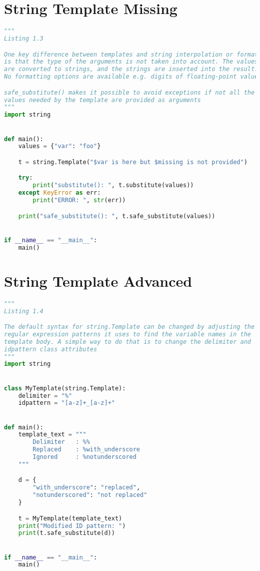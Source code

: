 \documentclass[a4paper,landscape]{report}
\begin{document}
\section{String Template Missing}
\begin{lstlisting}[language=Python]
"""
Listing 1.3

One key difference between templates and string interpolation or formatting
is that the type of the arguments is not taken into account. The values
are converted to strings, and the strings are inserted into the result.
No formatting options are available e.g. digits of floating-point value

safe_substitute() makes it possible to avoid exceptions if not all the
values needed by the template are provided as arguments
"""
import string


def main():
    values = {"var": "foo"}

    t = string.Template("$var is here but $missing is not provided")

    try:
        print("substitute(): ", t.substitute(values))
    except KeyError as err:
        print("ERROR: ", str(err))

    print("safe_substitute(): ", t.safe_substitute(values))


if __name__ == "__main__":
    main()

\end{lstlisting}
\section{String Template Advanced}
\begin{lstlisting}[language=Python]
"""
Listing 1.4

The default syntax for string.Template can be changed by adjusting the
regular expression patterns it uses to find the variable names in the
template body. A simple way to do that is to change the delimiter and
idpattern class attributes
"""
import string


class MyTemplate(string.Template):
    delimiter = "%"
    idpattern = "[a-z]+_[a-z]+"


def main():
    template_text = """
        Delimiter   : %%
        Replaced    : %with_underscore
        Ignored     : %notunderscored
    """

    d = {
        "with_underscore": "replaced",
        "notunderscored": "not replaced"
    }

    t = MyTemplate(template_text)
    print("Modified ID pattern: ")
    print(t.safe_substitute(d))


if __name__ == "__main__":
    main()

\end{lstlisting}
\end{document}
